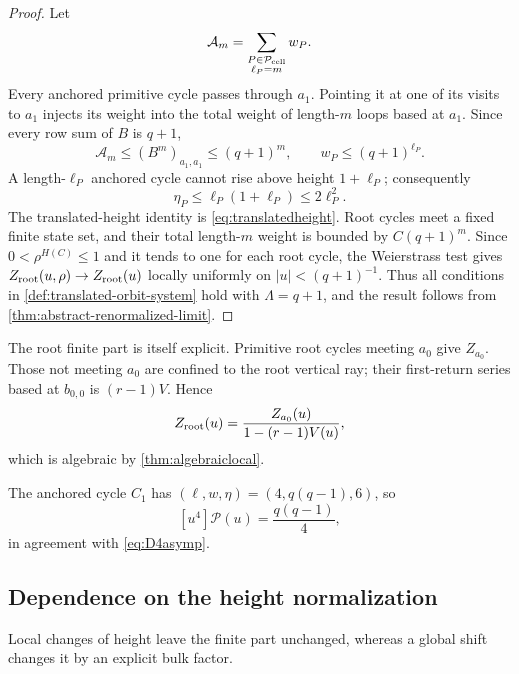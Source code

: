 \documentclass[11pt,reqno]{amsart}
\numberwithin{equation}{section}
\theoremstyle{definition}
\theoremstyle{remark}
\begin{document}
\begin{proof}
Let
\[
 \mathcal A_m=\sum_{\substack{P\in\mathcal P_{\rm cell}\\\ell_P=m}}w_P.
\]
Every anchored primitive cycle passes through $a_1$.  Pointing it at one of
its visits to $a_1$ injects its weight into the total weight of length-$m$
loops based at $a_1$.  Since every row sum of $B$ is $q+1$,
\begin{equation}\label{eq:anchored-path-bound}
 \mathcal A_m\le (B^m)_{a_1,a_1}\le(q+1)^m,
 \qquad
 w_P\le(q+1)^{\ell_P}.
\end{equation}
A length-$\ell_P$ anchored cycle cannot rise above height $1+\ell_P$;
consequently
\begin{equation}\label{eq:comb-height-bound}
 \eta_P\le\ell_P(1+\ell_P)\le2\ell_P^2.
\end{equation}
The translated-height identity is \eqref{eq:translatedheight}.  Root cycles
meet a fixed finite state set, and their total length-$m$ weight is bounded by
$C(q+1)^m$.  Since $0<\rho^{H(C)}\le1$ and it tends to one for each root
cycle, the Weierstrass test gives
$Z_{\rm root}(u,\rho)\to Z_{\rm root}(u)$ locally uniformly on
$|u|<(q+1)^{-1}$.  Thus all conditions in
\cref{def:translated-orbit-system} hold with $\Lambda=q+1$, and the result
follows from \cref{thm:abstract-renormalized-limit}.
\end{proof}

The root finite part is itself explicit.  Primitive root cycles meeting $a_0$
give $Z_{a_0}$.  Those not meeting $a_0$ are confined to the root vertical ray;
their first-return series based at $b_{0,0}$ is $(r-1)V$.  Hence
\begin{equation}\label{eq:rootfactor}
 Z_{\rm root}(u)=\frac{Z_{a_0}(u)}{1-(r-1)V(u)},
\end{equation}
which is algebraic by \cref{thm:algebraiclocal}.

The anchored cycle $C_1$ has $(\ell,w,\eta)=(4,q(q-1),6)$, so
\begin{equation}\label{eq:pressure-u4}
 [u^4]\mathscr P(u)=\frac{q(q-1)}4,
\end{equation}
in agreement with \eqref{eq:D4asymp}.

\subsection{Dependence on the height normalization}
\label{sec:height-covariance}

Local changes of height leave the finite part unchanged, whereas a global
shift changes it by an explicit bulk factor.
\end{document}
